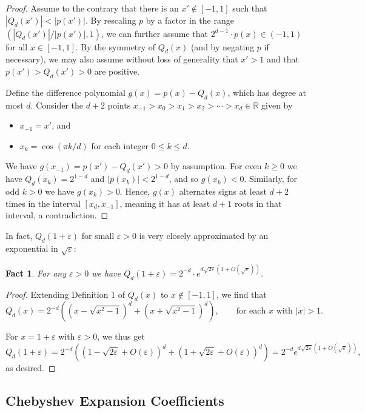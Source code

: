\documentclass[10pt,a4paper]{article}
\newcommand{\R}{\mathbb{R}}
\newcommand{\eps}{\varepsilon}
\theoremstyle{plain}\newtheorem{theorem}{Theorem}
\newtheorem{fact}[theorem]{Fact}
\theoremstyle{definition}
\begin{document}
\begin{proof}
Assume to the contrary that there is an $x' \notin [-1,1]$ such that $|Q_d(x')| < |p(x')|$. By rescaling $p$ by a factor in the range $(|Q_d(x')|/|p(x')|,1)$, we can further assume that $2^{d-1} \cdot p(x) \in (-1,1)$ for all $x \in [-1,1]$. By the symmetry of $Q_d(x)$ (and by negating $p$ if necessary), we may also assume without loss of generality that $x'>1$ and that $p(x') > Q_d(x') > 0$ are positive.

Define the difference polynomial $g(x) = p(x) - Q_d(x)$, which has degree at most $d$. Consider the $d+2$ points $x_{-1} > x_0 > x_1 > x_2 > \cdots > x_{d} \in \R$ given by \begin{itemize}
    \item $x_{-1} = x'$, and
    \item $x_k = \cos\left( \pi k / d \right)$ for each integer $0 \leq k \leq d$.
\end{itemize}
We have $g(x_{-1}) = p(x') - Q_d(x') > 0$ by assumption. For even $k \geq 0$ we have $Q_d(x_k) = 2^{1-d}$ and $|p(x_k)| < 2^{1-d}$, and so $g(x_k) < 0$. Similarly, for odd $k>0$ we have $g(x_k) > 0$. Hence, $g(x)$ alternates signs at least $d+2$ times in the interval $[x_d, x_{-1}]$, meaning it has at least $d+1$ roots in that interval, a contradiction.
\end{proof}

In fact, $Q_d(1+\eps)$ for small $\eps>0$ is very closely approximated by an exponential in $\sqrt{\eps}$:

\begin{fact} \label{chebyasympt}
For any $\eps > 0$ we have $Q_d(1+\eps) = 2^{-d} \cdot e^{d \sqrt{2 \eps} (1+O(\sqrt{\eps}))}$. 
\end{fact}

\begin{proof}
Extending Definition 1 of $Q_d(x)$ to $x \notin [-1,1]$, we find that
$$Q_d(x) = 2^{-d} \left( \left( x - \sqrt{x^2 - 1} \right)^d +  \left( x + \sqrt{x^2 - 1} \right)^d  \right), \qquad \text{for each $x$ with $|x|>1$.}$$

\noindent For $x = 1+\eps$ with $\eps>0$, we thus get
$$Q_d(1+\eps) = 2^{-d} \left( \left( 1 - \sqrt{2\eps} + O(\eps) \right)^d +  \left( 1+\sqrt{2\eps } + O(\eps) \right)^d  \right) = 2^{-d} e^{d \sqrt{2 \eps} (1+O(\sqrt{\eps}))},$$
as desired.
\end{proof}


	\subsection{Chebyshev Expansion Coefficients}
	
\end{document}
